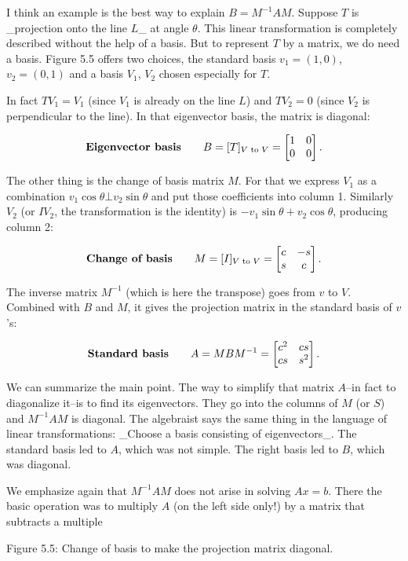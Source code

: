 I think an example is the best way to explain \(B=M^{-1}AM\). Suppose \(T\) is _projection onto the line \(L\)_ at angle \(\theta\). This linear transformation is completely described without the help of a basis. But to represent \(T\) by a matrix, we do need a basis. Figure 5.5 offers two choices, the standard basis \(v_{1}=(1,0)\), \(v_{2}=(0,1)\) and a basis \(V_{1}\), \(V_{2}\) chosen especially for \(T\).

In fact \(TV_{1}=V_{1}\) (since \(V_{1}\) is already on the line \(L\)) and \(TV_{2}=0\) (since \(V_{2}\) is perpendicular to the line). In that eigenvector basis, the matrix is diagonal:

\[\text{\bf Eigenvector basis}\qquad B=[T]_{V\text{ to }V}=\begin{bmatrix}1&0\\ 0&0\end{bmatrix}.\]

The other thing is the change of basis matrix \(M\). For that we express \(V_{1}\) as a combination \(v_{1}\cos\theta\bot v_{2}\sin\theta\) and put those coefficients into column 1. Similarly \(V_{2}\) (or \(IV_{2}\), the transformation is the identity) is \(-v_{1}\sin\theta+v_{2}\cos\theta\), producing column 2:

\[\text{\bf Change of basis}\qquad M=[I]_{V\text{ to }V}=\begin{bmatrix}c&-s\\ s&c\end{bmatrix}.\]

The inverse matrix \(M^{-1}\) (which is here the transpose) goes from \(v\) to \(V\). Combined with \(B\) and \(M\), it gives the projection matrix in the standard basis of \(v\)'s:

\[\text{\bf Standard basis}\qquad A=MBM^{-1}=\begin{bmatrix}c^{2}&cs\\ cs&s^{2}\end{bmatrix}.\]

We can summarize the main point. The way to simplify that matrix \(A\)--in fact to diagonalize it--is to find its eigenvectors. They go into the columns of \(M\) (or \(S\)) and \(M^{-1}AM\) is diagonal. The algebraist says the same thing in the language of linear transformations: _Choose a basis consisting of eigenvectors_. The standard basis led to \(A\), which was not simple. The right basis led to \(B\), which was diagonal.

We emphasize again that \(M^{-1}AM\) does not arise in solving \(Ax=b\). There the basic operation was to multiply \(A\) (on the left side only!) by a matrix that subtracts a multiple

Figure 5.5: Change of basis to make the projection matrix diagonal.

 